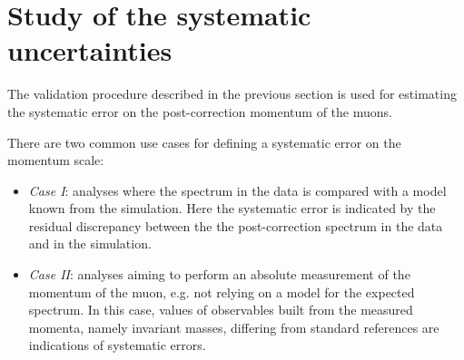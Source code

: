 \section{Study of the systematic uncertainties}
\label{sec:systematics}
The validation procedure described in the previous section is used for
estimating the systematic error on the post-correction momentum of the muons.

There are two common use cases for defining a systematic
error on the momentum scale: 
\begin{itemize}
\item {\sl Case I}: analyses where the spectrum in the data is compared
  with a model known from the simulation. Here the systematic error is
  indicated by the residual
  discrepancy between the the post-correction
  spectrum in the data and in the simulation.
\item {\sl Case II}: analyses aiming to perform an absolute measurement of the
  momentum of the muon, e.g. not relying on a model for the
  expected spectrum. In this case, values of observables built from the measured
  momenta, namely invariant masses, differing from standard
  references are indications of systematic errors. 
\end{itemize}


